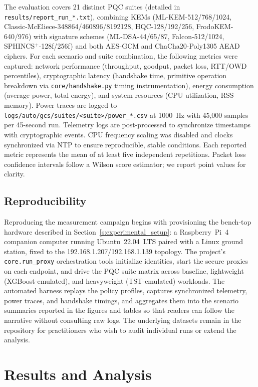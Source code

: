 \documentclass[sigconf,natbib=false]{acmart}
\begin{document}
The evaluation covers 21 distinct PQC suites (detailed in \texttt{results/report\_run\_*.txt}), combining KEMs (ML-KEM-512/768/1024, Classic-McEliece-348864/460896/8192128, HQC-128/192/256, FrodoKEM-640/976) with signature schemes (ML-DSA-44/65/87, Falcon-512/1024, SPHINCS$^+$-128f/256f) and both AES-GCM and ChaCha20-Poly1305 AEAD ciphers. For each scenario and suite combination, the following metrics were captured: network performance (throughput, goodput, packet loss, RTT/OWD percentiles), cryptographic latency (handshake time, primitive operation breakdown via \texttt{core/handshake.py} timing instrumentation), energy consumption (average power, total energy), and system resources (CPU utilization, RSS memory). Power traces are logged to \texttt{logs/auto/gcs/suites/<suite>/power\_*.csv} at 1000~Hz with 45,000 samples per 45-second run. Telemetry logs are post-processed to synchronize timestamps with cryptographic events. CPU frequency scaling was disabled and clocks synchronized via NTP to ensure reproducible, stable conditions. Each reported metric represents the mean of at least five independent repetitions. Packet loss confidence intervals follow a Wilson score estimator; we report point values for clarity.

\subsection{Reproducibility}

Reproducing the measurement campaign begins with provisioning the bench-top hardware described in Section~\ref{s:experimental_setup}: a Raspberry~Pi~4 companion computer running Ubuntu~22.04~LTS paired with a Linux ground station, fixed to the 192.168.1.207/192.168.1.139 topology. The project's \texttt{core.run\_proxy} orchestration tools initialize identities, start the secure proxies on each endpoint, and drive the PQC suite matrix across baseline, lightweight (XGBoost-emulated), and heavyweight (TST-emulated) workloads. The automated harness replays the policy profiles, captures synchronized telemetry, power traces, and handshake timings, and aggregates them into the scenario summaries reported in the figures and tables so that readers can follow the narrative without consulting raw logs. The underlying datasets remain in the repository for practitioners who wish to audit individual runs or extend the analysis.

\section{Results and Analysis}
\label{sec:results}
\end{document}
